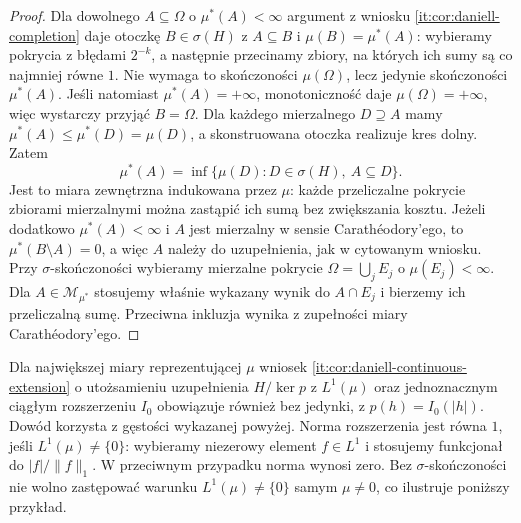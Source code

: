 \begin{proof}
Dla dowolnego $A\subseteq\Omega$ o $\mu^*(A)<\infty$
argument z wniosku \ref{it:cor:daniell-completion}
daje otoczkę $B\in\sigma(H)$ z
$A\subseteq B$ i $\mu(B)=\mu^*(A)$:
wybieramy pokrycia z błędami $2^{-k}$,
a następnie przecinamy zbiory, na których ich sumy
są co najmniej równe $1$. Nie wymaga to skończoności
$\mu(\Omega)$, lecz jedynie skończoności $\mu^*(A)$.
Jeśli natomiast $\mu^*(A)=+\infty$, monotoniczność
daje $\mu(\Omega)=+\infty$, więc wystarczy przyjąć
$B=\Omega$. Dla każdego mierzalnego $D\supseteq A$
mamy $\mu^*(A)\le\mu^*(D)=\mu(D)$, a skonstruowana
otoczka realizuje kres dolny. Zatem
\[
 \mu^*(A)=\inf\{\mu(D):D\in\sigma(H),\ A\subseteq D\}.
\]
Jest to miara zewnętrzna indukowana przez $\mu$:
każde przeliczalne pokrycie zbiorami mierzalnymi
można zastąpić ich sumą bez zwiększania kosztu.
Jeżeli dodatkowo $\mu^*(A)<\infty$ i $A$ jest mierzalny w sensie
Carathéodory'ego, to $\mu^*(B\setminus A)=0$,
a więc $A$ należy do uzupełnienia, jak w cytowanym
wniosku. Przy $\sigma$-skończoności wybieramy
mierzalne pokrycie $\Omega=\bigcup_j E_j$ o
$\mu(E_j)<\infty$. Dla $A\in\mathcal M_{\mu^*}$
stosujemy właśnie wykazany wynik do $A\cap E_j$
i bierzemy ich przeliczalną sumę.
Przeciwna inkluzja wynika z zupełności miary
Carathéodory'ego.
\end{proof}

\begin{uwaga}
Dla największej miary reprezentującej $\mu$ wniosek
\ref{it:cor:daniell-continuous-extension} o
utożsamieniu uzupełnienia $H/\ker p$ z $L^1(\mu)$
oraz jednoznacznym ciągłym rozszerzeniu $I_0$
obowiązuje również bez jedynki, z $p(h)=I_0(|h|)$.
Dowód korzysta z gęstości wykazanej powyżej.
Norma rozszerzenia jest równa $1$, jeśli
$L^1(\mu)\ne\{0\}$: wybieramy niezerowy element
$f\in L^1$ i stosujemy funkcjonał do
$|f|/\|f\|_1$. W przeciwnym przypadku norma
wynosi zero. Bez $\sigma$-skończoności nie wolno
zastępować warunku $L^1(\mu)\ne\{0\}$ samym
$\mu\ne0$, co ilustruje poniższy przykład.
\end{uwaga}

